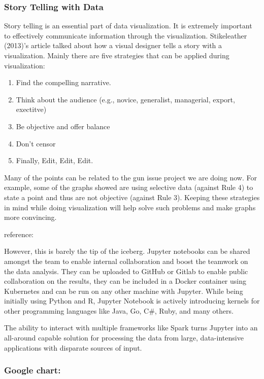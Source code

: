 \documentclass[]{book}
\providecommand{\tightlist}{%
  \setlength{\itemsep}{0pt}\setlength{\parskip}{0pt}}
\theoremstyle{definition}
\theoremstyle{definition}
\theoremstyle{definition}
\theoremstyle{remark}
\begin{document}
\subsubsection{Story Telling with Data}\label{story-telling-with-data}

Story telling is an essential part of data visualization. It is
extremely important to effectively communicate information through the
visualization. Stikeleather (2013)'s article talked about how a visual
designer tells a story with a visualization. Mainly there are five
strategies that can be applied during visualization:

\begin{enumerate}
\def\labelenumi{\arabic{enumi}.}
\tightlist
\item
  Find the compelling narrative.
\item
  Think about the audience (e.g., novice, generalist, managerial,
  export, exectitve)
\item
  Be objective and offer balance
\item
  Don't censor
\item
  Finally, Edit, Edit, Edit.
\end{enumerate}

Many of the points can be related to the gun issue project we are doing
now. For example, some of the graphs showed are using selective data
(against Rule 4) to state a point and thus are not objective (against
Rule 3). Keeping these strategies in mind while doing visualization will
help solve such problems and make graphs more convincing.

reference: \citep{storytelling}

However, this is barely the tip of the iceberg. Jupyter notebooks can be
shared amongst the team to enable internal collaboration and boost the
teamwork on the data analysis. They can be uploaded to GitHub or Gitlab
to enable public collaboration on the results, they can be included in a
Docker container using Kubernetes and can be run on any other machine
with Jupyter. While being initially using Python and R, Jupyter Notebook
is actively introducing kernels for other programming languages like
Java, Go, C\#, Ruby, and many others.

The ability to interact with multiple frameworks like Spark turns
Jupyter into an all-around capable solution for processing the data from
large, data-intensive applications with disparate sources of input.

\subsubsection{Google chart:}\label{google-chart}
\end{document}
